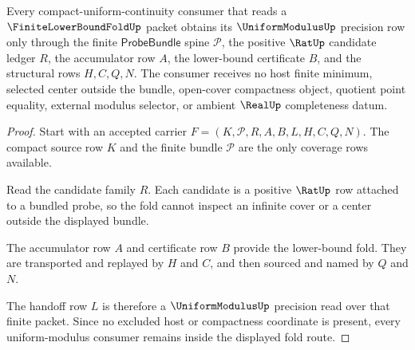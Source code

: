\begin{theorem}
\label{thm:finite-lower-bound-fold-uniform-modulus-handoff}
Every compact-uniform-continuity consumer that reads a $\FiniteLowerBoundFoldUp$ packet obtains its $\UniformModulusUp$ precision row only through the finite $\mathsf{ProbeBundle}$ spine $\mathcal{P}$, the positive $\RatUp$ candidate ledger $R$, the accumulator row $A$, the lower-bound certificate $B$, and the structural rows $H,C,Q,N$. The consumer receives no host finite minimum, selected center outside the bundle, open-cover compactness object, quotient point equality, external modulus selector, or ambient $\RealUp$ completeness datum.
\end{theorem}
\begin{proof}
Start with an accepted carrier $F=(K,\mathcal{P},R,A,B,L,H,C,Q,N)$. The compact source row $K$ and the finite bundle $\mathcal{P}$ are the only coverage rows available.

Read the candidate family $R$. Each candidate is a positive $\RatUp$ row attached to a bundled probe, so the fold cannot inspect an infinite cover or a center outside the displayed bundle.

The accumulator row $A$ and certificate row $B$ provide the lower-bound fold. They are transported and replayed by $H$ and $C$, and then sourced and named by $Q$ and $N$.

The handoff row $L$ is therefore a $\UniformModulusUp$ precision read over that finite packet. Since no excluded host or compactness coordinate is present, every uniform-modulus consumer remains inside the displayed fold route.
\end{proof}


